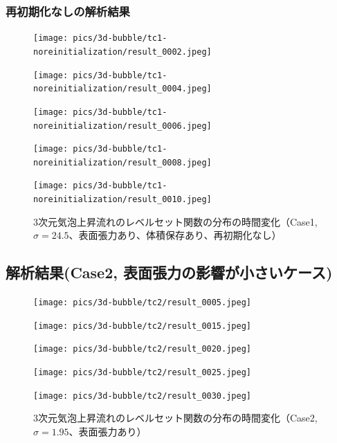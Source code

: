 \subsubsection{再初期化なしの解析結果}
\begin{figure}[H]
	\centering
	\begin{minipage}[b]{0.16\columnwidth}
	    \centering
	    \texttt{[image: pics/3d-bubble/tc1-noreinitialization/result\_0002.jpeg]}
	\end{minipage}
	\begin{minipage}[b]{0.16\columnwidth}
	    \centering
	    \texttt{[image: pics/3d-bubble/tc1-noreinitialization/result\_0004.jpeg]}
	\end{minipage}
	\begin{minipage}[b]{0.16\columnwidth}
	    \centering
	    \texttt{[image: pics/3d-bubble/tc1-noreinitialization/result\_0006.jpeg]}
	\end{minipage}
	\begin{minipage}[b]{0.16\columnwidth}
	    \centering
	    \texttt{[image: pics/3d-bubble/tc1-noreinitialization/result\_0008.jpeg]}
	\end{minipage}
	\begin{minipage}[b]{0.16\columnwidth}
	    \centering
	    \texttt{[image: pics/3d-bubble/tc1-noreinitialization/result\_0010.jpeg]}
	\end{minipage}

	\caption{3次元気泡上昇流れのレベルセット関数の分布の時間変化（Case1, $\sigma=24.5$、表面張力あり、体積保存あり、再初期化なし）}
	\label{fig:3d-bubble_result_tc1}
\end{figure}

\newpage
\subsection{解析結果(Case2, 表面張力の影響が小さいケース)}
\begin{figure}[H]
	\centering
	\begin{minipage}[b]{0.16\columnwidth}
	    \centering
	    \texttt{[image: pics/3d-bubble/tc2/result\_0005.jpeg]}
	\end{minipage}
	\begin{minipage}[b]{0.16\columnwidth}
	    \centering
	    \texttt{[image: pics/3d-bubble/tc2/result\_0015.jpeg]}
	\end{minipage}
	\begin{minipage}[b]{0.16\columnwidth}
	    \centering
	    \texttt{[image: pics/3d-bubble/tc2/result\_0020.jpeg]}
	\end{minipage}
	\begin{minipage}[b]{0.16\columnwidth}
	    \centering
	    \texttt{[image: pics/3d-bubble/tc2/result\_0025.jpeg]}
	\end{minipage}
	\begin{minipage}[b]{0.16\columnwidth}
	    \centering
	    \texttt{[image: pics/3d-bubble/tc2/result\_0030.jpeg]}
	\end{minipage}

	\caption{3次元気泡上昇流れのレベルセット関数の分布の時間変化（Case2, $\sigma=1.95$、表面張力あり）}
	\label{fig:3d-bubble_result_tc2}
\end{figure}


